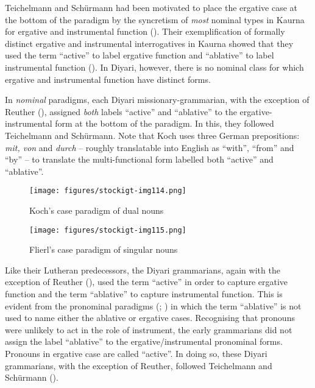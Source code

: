 Teichelmann and Schürmann had been motivated to place the ergative case at the bottom of the paradigm by the syncretism of \textit{most} nominal types in Kaurna for ergative and instrumental function (). Their exemplification of formally distinct ergative and instrumental interrogatives in Kaurna showed that they used the term “active” to label ergative function and “ablative” to label instrumental function (). In Diyari, however, there is no nominal class for which ergative and instrumental function have distinct forms.

In \textit{nominal} paradigms, each Diyari missionary-grammarian, with the exception of Reuther (), assigned \textit{both} labels “active” and “ablative” to the er\-ga\-tive-instrumental form at the bottom of the paradigm. In this, they followed Teichelmann and Schürmann. Note that Koch uses three German prepositions: \textit{mit, von} and \textit{durch} – roughly translatable into English as ``with'', ``from'' and ``by'' – to translate the multi-functional form labelled both “active” and “ablative''.


\begin{figure}
\texttt{[image: figures/stockigt-img114.png]}
\caption{Koch’s case paradigm of dual nouns \citeyearpar{koch_untitled_1868}}
\label{bkm:Ref449368478}\label{fig:key:165}
\end{figure}



\begin{figure}
\texttt{[image: figures/stockigt-img115.png]}
\caption{Flierl’s case paradigm of singular nouns \citeyearpar[10--11]{flierl_christianieli_1880}}
\label{bkm:Ref449368538}\label{fig:key:166}
\end{figure}

Like their Lutheran predecessors, the Diyari grammarians, again with the exception of Reuther (), used the term “active” in order to capture ergative function and the term “ablative” to capture instrumental function. This is evident from the pronominal paradigms (; ) in which the term “ablative” is not used to name either the ablative or ergative cases. Recognising that pronouns were unlikely to act in the role of instrument, the early grammarians did not assign the label “ablative” to the ergative/instrumental pronominal forms. Pronouns in ergative case are called “active''. In doing so, these Diyari grammarians, with the exception of Reuther, followed Teichelmann and Schürmann ().


